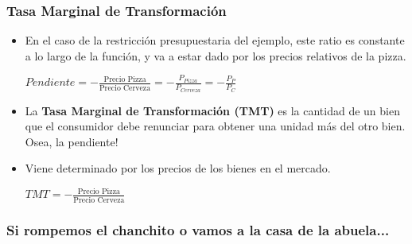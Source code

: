 \documentclass{beamer}
\begin{document}
\begin{frame}
\frametitle{Tasa Marginal de Transformación}
\begin{itemize}
    \item En el caso de la restricción presupuestaria del ejemplo, este ratio es constante a lo largo de la función, y va a estar dado por los precios relativos de la pizza. \\ \vspace{2mm}
     \begin{center}
    $Pendiente = - \frac{\text{Precio Pizza}}{\text{Precio Cerveza}}= -\frac{P_{Pizza}}{P_{Cerveza}}=-\frac{P_P}{P_C}$
    \end{center}
   \vspace{2mm}
    \item La \textbf{Tasa Marginal de Transformación (TMT)} es la cantidad de un bien que el consumidor debe renunciar para obtener una unidad más del otro bien. Osea, la pendiente!
    \item Viene determinado por los precios de los bienes en el mercado.\\ \vspace{6mm} 
    \begin{center}
      $TMT = - \frac{\text{Precio Pizza}}{\text{Precio Cerveza}}$
      \end{center}
\end{itemize} 
\end{frame}

\begin{frame}
\frametitle{Si rompemos el chanchito o vamos a la casa de la abuela...}
\begin{center}
\end{center}
\end{frame}
\end{document}
